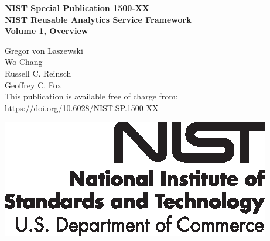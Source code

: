 \documentclass[12pt]{article}
\newcommand{\pubnumber}{1500-XX}
\newcommand{\DOI}{https://doi.org/10.6028/NIST.SP.1500-XX}
\newcommand{\TITLE}{NIST Reusable Analytics Service Framework\\
Volume 1, Overview}
\newcommand{\AUTHORS}{
\large Gregor von Laszewski\\
\large Wo Chang\\
\large Russell C. Reinsch\\
\large Geoffrey C. Fox\\
\vfill}
\begin{document}
	\begin{titlepage}
		\begin{flushright}
        \LARGE{\textbf{NIST Special Publication \pubnumber}}\\
        \vfill
        \Huge{\textbf{\TITLE}}\\
        \vfill
        \AUTHORS
        \normalsize This publication is available free of charge from:\\
        \DOI\\
        \vfill

        \includegraphics[width=0.3\linewidth]{format/NIST-logo.eps}\\ 

        \end{flushright}
    \end{titlepage}
\end{document}
